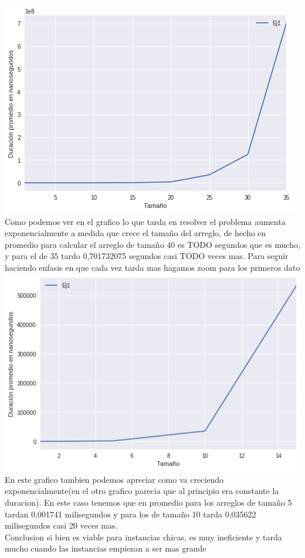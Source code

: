 \includegraphics[scale=0.5]{ej1Random1-40.png}\\
Como podemos ver en el grafico lo que tarda en resolver el problema aumenta exponencialmente a medida que crece el tamaño del arreglo, de hecho en promedio para calcular el arreglo de tamaño 40 es TODO segundos que es mucho, y para el de 35 tardo 0,701732075 segundos casi TODO veces mas. Para seguir haciendo enfasis en que cada vez tarda mas hagamos zoom para los primeros dato\\ 
\includegraphics[scale=0.5]{ej1Random1-5.png}\\
En este grafico tambien podemos apreciar como va creciendo exponencialmente(en el otro grafico parecia que al principio era constante la duracion). En este caso tenemos que en promedio para los arreglos de tamaño 5 tardan 0,001741 milisegundos y para los de tamaño 10 tarda 0,035622 milisegundos casi 20 veces mas.\\

Conclusion si bien es viable para instancias chicas, es muy ineficiente y tarda mucho cuando las instancias empiezan a ser mas grande




